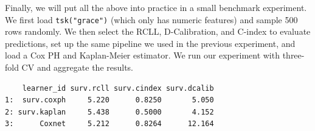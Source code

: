 Finally, we will put all the above into practice in a small benchmark
experiment. We first load \texttt{tsk("grace")} (which only has numeric
features) and sample 500 rows randomly. We then select the RCLL,
D-Calibration, and C-index to evaluate predictions, set up the same
pipeline we used in the previous experiment, and load a Cox PH and
Kaplan-Meier estimator. We run our experiment with three-fold CV and
aggregate the results.

\begin{Shaded}
\begin{Highlighting}[]

\OtherTok{=} \NormalTok{(}\NormalTok{)}
\SpecialCharTok{$}\NormalTok{(}\SpecialCharTok{$}\NormalTok{))}
\OtherTok{=} \NormalTok{(}\NormalTok{, }\NormalTok{, }\NormalTok{)}
\OtherTok{=} 

\OtherTok{=} \NormalTok{(}\NormalTok{(}
  \NormalTok{,}
   \NormalTok{(}\NormalTok{),}
   \NormalTok{,}
   
\NormalTok{))}
\SpecialCharTok{$}\OtherTok{=} 
\OtherTok{=} \NormalTok{(}\NormalTok{(}\NormalTok{(}\NormalTok{, }

\OtherTok{=} \NormalTok{(}
  \NormalTok{(}\NormalTok{, } \NormalTok{)))}
\SpecialCharTok{$}\NormalTok{(measures)[, }\NormalTok{(}\NormalTok{, ..msr\_txt)]}
\end{Highlighting}
\end{Shaded}

\begin{verbatim}
    learner_id surv.rcll surv.cindex surv.dcalib
1:  surv.coxph     5.220      0.8250       5.050
2: surv.kaplan     5.438      0.5000       4.152
3:      Coxnet     5.212      0.8264      12.164
\end{verbatim}

